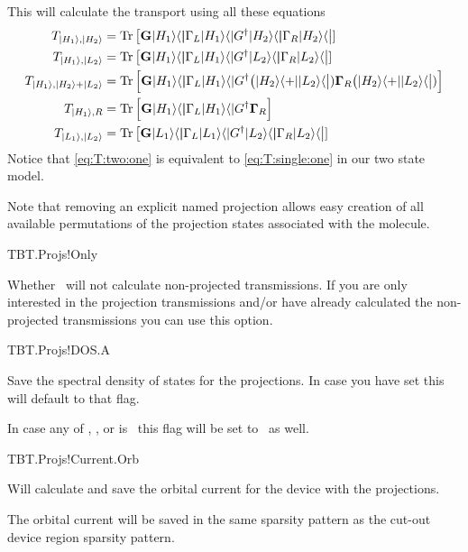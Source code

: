 \bgroup
\def\Gf{\mathbf G}
\def\Gam{\boldsymbol\Gamma}

This will calculate the transport using all these equations
\begin{align}
  \label{eq:T:proj:1}
  T_{\ket{H_1},\ket{H_2}} &=\Tr\big[\Gf\kb{H_1}\Gam_L\kb{H_1}\Gf^\dagger\kb{H_2}\Gam_R\kb{H_2}\big]
  \\
  \label{eq:T:proj:2}
  T_{\ket{H_1},\ket{L_2}} &=\Tr\big[\Gf\kb{H_1}\Gam_L\kb{H_1}\Gf^\dagger\kb{L_2}\Gam_R\kb{L_2}\big]
  \\
  \label{eq:T:two:one}
  T_{\ket{H_1},\ket{H_2}+\ket{L_2}}
  &=\Tr\Big[\Gf\kb{H_1}\Gam_L\kb{H_1}\Gf^\dagger\big(\kb{H_2}+\kb{L_2}\big)\Gam_R\big(\kb{H_2}+\kb{L_2}\big)\Big]
  \\
  \label{eq:T:single:one}
  T_{\ket{H_1},R} &=\Tr\Big[\Gf\kb{H_1}\Gam_L\kb{H_1}\Gf^\dagger\Gam_R\Big]
  \\
  \label{eq:T:proj:5}
  T_{\ket{L_1},\ket{L_2}} &=\Tr\big[\Gf\kb{L_1}\Gam_L\kb{L_1}\Gf^\dagger\kb{L_2}\Gam_R\kb{L_2}\big]
\end{align}
\egroup %
Notice that \ref{eq:T:two:one} is equivalent to \ref{eq:T:single:one}
in our two state model.

Note that removing an explicit named projection allows easy creation
of all available permutations of the projection states associated with
the molecule.


\begin{fdflogicalF}{TBT.Projs!Only}

  Whether \tbtrans\ will not calculate non-projected transmissions. If
  you are only interested in the projection transmissions and/or have
  already calculated the non-projected transmissions you can use this
  option.
  
\end{fdflogicalF}

\begin{fdflogicalF}{TBT.Projs!DOS.A}%

  Save the spectral density of states for the projections. In case you
  have set  this will default to that flag.

  In case any of , ,
   or  is \fdftrue\ this
  flag will be set to \fdftrue\ as well.

\end{fdflogicalF}

\begin{fdflogicalF}{TBT.Projs!Current.Orb}%

  Will calculate and save the orbital current for the device with the
  projections.

  The orbital current will be saved in the same sparsity pattern as
  the cut-out device region sparsity pattern. 
  
\end{fdflogicalF}


